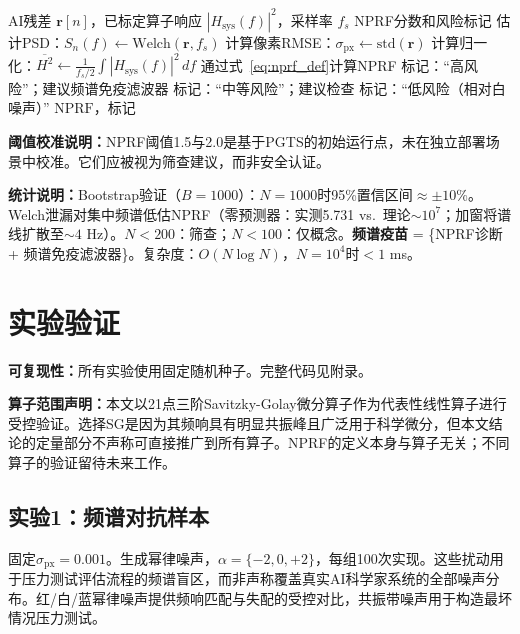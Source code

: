 \documentclass[9pt,twocolumn]{article}
\theoremstyle{remark}
\theoremstyle{definition}
\newcommand{\pxrmse}{\sigma_{\text{px}}}
\newcommand{\nprf}{\text{NPRF}}
\newcommand{\snf}{S_n(f)}
\newcommand{\hsysf}{|H_{\text{sys}}(f)|^2}
\newcommand{\Hsqmean}{\overline{H^2}}
\newcommand{\algorithmiccompact}{\renewcommand{\algorithmicrequire}{\textbf{输入：}}\renewcommand{\algorithmicensure}{\textbf{输出：}}}
\newcommand{\澔}{%
  \hbox{%
    \scalebox{0.75}[1]{氵}%
    \kern -0.3em%
    \scalebox{0.8}[1]{皓}%
  }%
}
\begin{document}
\begin{algorithm}[htbp]
\scriptsize
\algorithmiccompact
\begin{algorithmic}[1]
\Require AI残差 $\mathbf{r}[n]$，已标定算子响应 $\hsysf$，采样率 $f_s$
\Ensure NPRF分数和风险标记
\State 估计PSD：$\snf \leftarrow \text{Welch}(\mathbf{r}, f_s)$ 
\State 计算像素RMSE：$\pxrmse \leftarrow \text{std}(\mathbf{r})$
\State 计算归一化：$\Hsqmean \leftarrow \frac{1}{f_s/2}\int \hsysf \, df$
\State 通过式~\eqref{eq:nprf_def}计算NPRF
\If{$\nprf > 2.0$}
    \State 标记：“高风险”；建议频谱免疫滤波器
\ElsIf{$\nprf > 1.5$}
    \State 标记：“中等风险”；建议检查
\Else
    \State 标记：“低风险（相对白噪声）”
\EndIf
\State \Return $\nprf$，标记
\end{algorithmic}
\caption{频谱免疫检查（部署就绪）}
\label{alg:nprf}
\end{algorithm}

\textbf{阈值校准说明：}NPRF阈值1.5与2.0是基于PGTS的初始运行点，未在独立部署场景中校准。它们应被视为筛查建议，而非安全认证。

\textbf{统计说明：}Bootstrap验证（$B=1000$）：$N=1000$时95\%置信区间$\approx\pm10\%$。Welch泄漏对集中频谱低估NPRF（零预测器：实测5.731 vs.\ 理论$\sim10^7$；加窗将谱线扩散至$\sim4$ Hz）。$N<200$：筛查；$N<100$：仅概念。\textbf{频谱疫苗} = \{NPRF诊断 + 频谱免疫滤波器\}。复杂度：$O(N\log N)$，$N=10^4$时$<1$ ms。

\section{实验验证}

\begingroup
\scriptsize
\textbf{可复现性：}所有实验使用固定随机种子。完整代码见附录。

\textbf{算子范围声明：}本文以21点三阶Savitzky-Golay微分算子作为代表性线性算子进行受控验证。选择SG是因为其频响具有明显共振峰且广泛用于科学微分，但本文结论的定量部分不声称可直接推广到所有算子。NPRF的定义本身与算子无关；不同算子的验证留待未来工作。
\endgroup

\vspace{1pt}

\subsection{实验1：频谱对抗样本}

固定$\pxrmse = 0.001$。生成幂律噪声\cite{kasdin1995}，$\alpha=\{-2, 0, +2\}$，每组100次实现。这些扰动用于压力测试评估流程的频谱盲区，而非声称覆盖真实AI科学家系统的全部噪声分布。红/白/蓝幂律噪声提供频响匹配与失配的受控对比，共振带噪声用于构造最坏情况压力测试。
\end{document}
